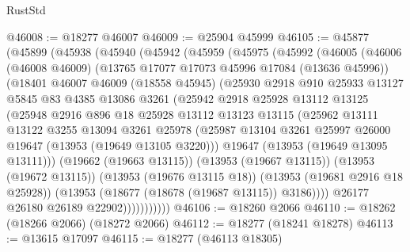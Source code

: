 \begin{lexlean}{RustStd}
\begin{coremodule}
@46008 := @18277 @46007
@46009 := @25904 @45999
@46105 := @45877
    (@45899
      (@45938
        (@45940
          (@45942
            (@45959
              (@45975
                (@45992
                  (@46005
                    (@46006
                      (@46008 @46009)
                      (@13765 @17077 @17073 @45996 @17084 (@13636 @45996))
                      (@18401
                        @46007
                        @46009
                        (@18558 @45945)
                        (@25930
                          @2918
                          @910
                          @25933
                          @13127
                          @5845
                          @83
                          @4385
                          @13086
                          @3261
                          (@25942
                            @2918
                            @25928
                            @13112
                            @13125
                            (@25948
                              @2916
                              @896
                              @18
                              @25928
                              @13112
                              @13123
                              @13115
                              (@25962
                                @13111
                                @13122
                                @3255
                                @13094
                                @3261
                                @25978
                                (@25987
                                  @13104
                                  @3261
                                  @25997
                                  @26000
                                  @19647
                                  (@13953 (@19649 @13105 @3220)))
                                @19647
                                (@13953 (@19649 @13095 @13111)))
                              (@19662 (@19663 @13115))
                              (@13953 (@19667 @13115))
                              (@13953 (@19672 @13115))
                              (@13953 (@19676 @13115 @18))
                              (@13953 (@19681 @2916 @18 @25928))
                              (@13953 (@18677 (@18678 (@19687 @13115)) @3186))))
                          @26177
                          @26180
                          @26189
                          @22902)))))))))))
@46106 := @18260 @2066
@46110 := @18262 (@18266 @2066) (@18272 @2066)
@46112 := @18277 (@18241 @18278)
@46113 := @13615 @17097
@46115 := @18277 (@46113 @18305)

\end{coremodule}
\end{lexlean}
